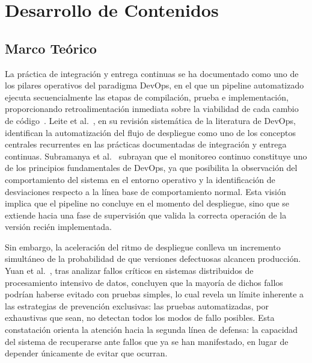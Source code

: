 \documentclass[conference]{IEEEtran}
\begin{document}
\section{Desarrollo de Contenidos}

\subsection{Marco Te\'orico}

La pr\'actica de integraci\'on y entrega continuas se ha documentado como uno de los pilares operativos del paradigma DevOps, en el que un pipeline automatizado ejecuta secuencialmente las etapas de compilaci\'on, prueba e implementaci\'on, proporcionando retroalimentaci\'on inmediata sobre la viabilidad de cada cambio de c\'odigo~\cite{humble2010continuous}. Leite et al.~\cite{leite2017analysis}, en su revisi\'on sistem\'atica de la literatura de DevOps, identifican la automatizaci\'on del flujo de despliegue como uno de los conceptos centrales recurrentes en las pr\'acticas documentadas de integraci\'on y entrega continuas. Subramanya et al.~\cite{subramanya2022devops} subrayan que el monitoreo continuo constituye uno de los principios fundamentales de DevOps, ya que posibilita la observaci\'on del comportamiento del sistema en el entorno operativo y la identificaci\'on de desviaciones respecto a la l\'inea base de comportamiento normal. Esta visi\'on implica que el pipeline no concluye en el momento del despliegue, sino que se extiende hacia una fase de supervisi\'on que valida la correcta operaci\'on de la versi\'on reci\'en implementada.

Sin embargo, la aceleraci\'on del ritmo de despliegue conlleva un incremento simult\'aneo de la probabilidad de que versiones defectuosas alcancen producci\'on. Yuan et al.~\cite{yuan2014simple}, tras analizar fallos cr\'iticos en sistemas distribuidos de procesamiento intensivo de datos, concluyen que la mayor\'ia de dichos fallos podr\'ian haberse evitado con pruebas simples, lo cual revela un l\'imite inherente a las estrategias de prevenci\'on exclusivas: las pruebas automatizadas, por exhaustivas que sean, no detectan todos los modos de fallo posibles. Esta constataci\'on orienta la atenci\'on hacia la segunda l\'inea de defensa: la capacidad del sistema de recuperarse ante fallos que ya se han manifestado, en lugar de depender \'unicamente de evitar que ocurran.
\end{document}
